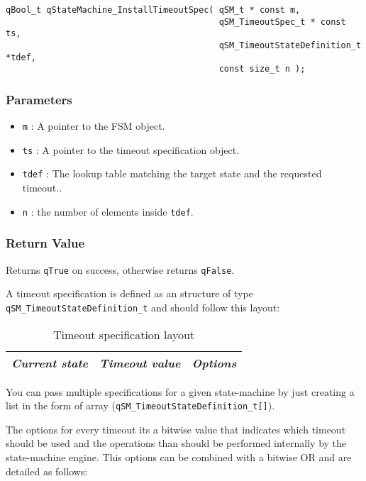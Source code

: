 \begin{lstlisting}[style=CStyle]
qBool_t qStateMachine_InstallTimeoutSpec( qSM_t * const m,  
                                          qSM_TimeoutSpec_t * const ts, 
                                          qSM_TimeoutStateDefinition_t *tdef, 
                                          const size_t n );
\end{lstlisting} 

\subsubsection*{Parameters}
\begin{itemize}
    \item \lstinline{m} : A pointer to the FSM object. 
    \item \lstinline{ts} : A pointer to the timeout specification object.
    \item \lstinline{tdef} : The lookup table matching the target state and the requested timeout..
    \item \lstinline{n} : the number of elements inside \lstinline{tdef}.
\end{itemize}

\subsubsection*{Return Value}
Returns \lstinline{qTrue} on success, otherwise returns \lstinline{qFalse}.

\hrulefill

A timeout specification is defined as an structure of type \lstinline{qSM_TimeoutStateDefinition_t} and should follow this layout:

\begin{table}[H]
\centering
\begin{tabular}{||c c c||} 
 \hline
 \textit{Current state} & \textit{Timeout value} & \textit{Options} \\ [0.5ex] 
 \hline
\end{tabular}
\caption{Timeout specification layout}
\label{timeoutspec_table_layout}
\end{table}

You can pass multiple specifications for a given state-machine by just creating a list in the form of array (\lstinline{qSM_TimeoutStateDefinition_t[]}).

The options for every timeout its a bitwise value that indicates which timeout should be used and the operations than should be performed internally by the state-machine engine. This options can be combined with a bitwise OR and are detailed as follows:

